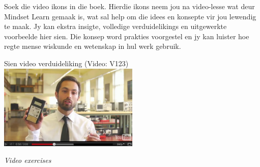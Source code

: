 {\Large

Soek die video ikons in die boek. Hierdie ikons neem jou na video-lesse wat deur Mindset Learn gemaak is, wat sal help om die idees en konsepte vir jou lewendig te maak. Jy kan ekstra insigte, volledige verduidelikings en uitgewerkte voorbeelde hier sien. Die konsep word prakties voorgestel en jy kan luister hoe regte mense wiskunde en wetenskap in hul werk gebruik. \par

\begin{center}
Sien video verduideliking  (Video: V123)\\
\includegraphics[width=0.5\textwidth]{title_images/veritasiumvideo.png}
\end{center}\par

}
\vspace{0.5cm}
{\normalfont\sffamily\fontsize{22}\normalfont\itshape Video exercises} \par

